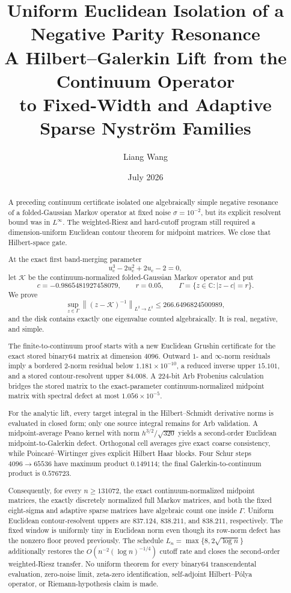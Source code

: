 \documentclass[11pt]{article}
\title{Uniform Euclidean Isolation of a Negative Parity Resonance\\
\large A Hilbert--Galerkin Lift from the Continuum Operator\\
to Fixed-Width and Adaptive Sparse Nystr\"om Families}
\author{Liang Wang}
\date{July 2026}
\theoremstyle{definition}
\theoremstyle{remark}
\newcommand{\C}{\mathbb C}
\newcommand{\cK}{\mathcal K}
\newcommand{\uc}{u_{\mathrm c}}
\newcommand{\norm}[1]{\left\lVert #1\right\rVert}
\begin{document}
\maketitle

\begin{abstract}
A preceding continuum certificate isolated one algebraically simple negative
resonance of a folded-Gaussian Markov operator at fixed noise
$\sigma=10^{-2}$, but its explicit resolvent bound was in
$L^\infty$.  The weighted-Riesz and hard-cutoff program still required a
dimension-uniform Euclidean contour theorem for midpoint matrices.  We close
that Hilbert-space gate.

At the exact first band-merging parameter
\[
 \uc^3-2\uc^2+2\uc-2=0,
\]
let $\cK$ be the continuum-normalized folded-Gaussian Markov operator and
put
\[
 c=-0.9865481927458079,\qquad r=0.05,\qquad
 \Gamma=\{z\in\C:|z-c|=r\}.
\]
We prove
\[
 \sup_{z\in\Gamma}\norm{(z-\cK)^{-1}}_{L^2\to L^2}
 \le266.6496824500989,
\]
and the disk contains exactly one eigenvalue counted algebraically.  It is
real, negative, and simple.

The finite-to-continuum proof starts with a new Euclidean Grushin
certificate for the exact stored binary64 matrix at dimension $4096$.
Outward $1$- and $\infty$-norm residuals imply a bordered
$2$-norm residual below $1.181\times10^{-10}$, a reduced inverse upper
$15.101$, and a stored contour-resolvent upper $84.008$.  A 224-bit Arb
Frobenius calculation bridges the stored matrix to the exact-parameter
continuum-normalized midpoint matrix with spectral defect at most
$1.056\times10^{-5}$.

For the analytic lift, every target integral in the Hilbert--Schmidt
derivative norms is evaluated in closed form; only one source integral
remains for Arb validation.  A midpoint-average Peano kernel with norm
$h^{3/2}/\sqrt{320}$ yields a second-order Euclidean
midpoint-to-Galerkin defect.  Orthogonal cell averages give exact coarse
consistency, while Poincar\'e--Wirtinger gives explicit Hilbert Haar blocks.
Four Schur steps $4096\to65536$ have maximum product $0.149114$; the final
Galerkin-to-continuum product is $0.576723$.

Consequently, for every $n\ge131072$, the exact continuum-normalized
midpoint matrices, the exactly discretely normalized full Markov matrices,
and both the fixed eight-sigma and adaptive sparse matrices have algebraic
count one inside $\Gamma$.  Uniform Euclidean contour-resolvent uppers are
$837.124$, $838.211$, and $838.211$, respectively.  The fixed window is
uniformly tiny in Euclidean norm even though its row-norm defect has the
nonzero floor proved previously.  The schedule
$L_n=\max\{8,2\sqrt{\log n}\}$ additionally restores the
$O(n^{-2}(\log n)^{-1/4})$ cutoff rate and closes the second-order
weighted-Riesz transfer.  No uniform theorem for every binary64
transcendental evaluation, zero-noise limit, zeta-zero identification,
self-adjoint Hilbert--P\'olya operator, or Riemann-hypothesis claim is made.
\end{abstract}
\end{document}
